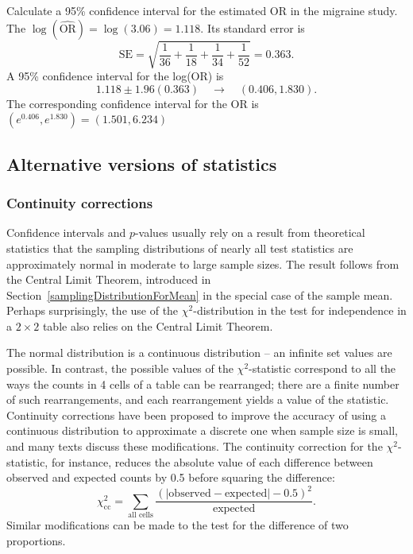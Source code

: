 \begin{examplewrap}
\begin{nexample}{Calculate a 95\% confidence interval for the estimated OR in the migraine study.}
The $\log(\widehat{\text{OR}}) = \log(3.06) = 1.118$.   Its standard error is
    \[
      \text{SE} = \sqrt{\frac{1}{36} + \frac{1}{18}
   + \frac{1}{34} + \frac{1}{52}} = 0.363.
 \]
A 95\% confidence interval for the log(OR) is
\[
      1.118 \pm 1.96(0.363) \quad \to \quad (0.406, 1.830).
\]
The corresponding confidence interval for the OR is $(e^{0.406}, e^{1.830}) = (1.501, 6.234)$
\end{nexample}
\end{examplewrap}

\subsection{Alternative versions of statistics}
\label{alternativeTestStatisticsBinaryData}

\subsubsection{Continuity corrections}

Confidence intervals and $p$-values usually rely on a result from theoretical statistics that the sampling distributions of nearly all test statistics are approximately normal in moderate to large sample sizes.  The result follows from the Central Limit Theorem, introduced in Section~\ref{samplingDistributionForMean} in the special case of the sample mean. Perhaps surprisingly, the use of the $\chi^2$-distribution in the test for independence in a $2 \times 2$ table also relies on the Central Limit Theorem.

The normal distribution is a continuous distribution -- an infinite set values are possible. In contrast, the possible values of the $\chi^2$-statistic correspond to all the ways the counts in 4 cells of a table can be rearranged; there are a finite number of such rearrangements, and each rearrangement yields a value of the statistic. Continuity corrections have been proposed to improve the accuracy of using a continuous distribution to approximate a discrete one when sample size is small, and many texts discuss these modifications. The continuity correction for the $\chi^2$-statistic, for instance, reduces the absolute value of each difference between observed and expected counts by 0.5 before squaring the difference:
\[
\chi^2_{\text{cc}} = \sum_{\text{all cells}} \frac{(|\text{observed} - \text{expected}| - 0.5)^2}{\text{expected}}.
\]
Similar modifications can be made to the test for the difference of two proportions.

